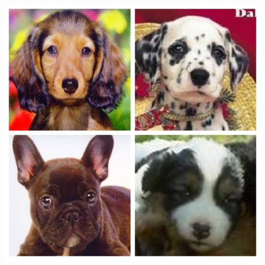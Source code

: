 \documentclass[12pt]{article}
\begin{document}
\begin{minipage}[t]{0.2\textwidth} 
	\includegraphics[width=1\textwidth]{Images/dog.jpg}
\end{minipage}

\end{document}
